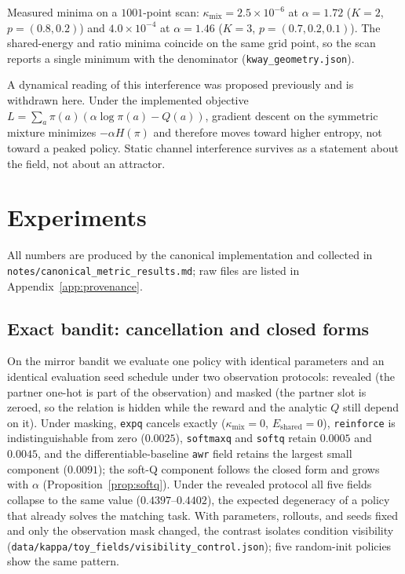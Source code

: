\documentclass{article}
\newcommand{\kmix}{\kappa_{\mathrm{mix}}}
\begin{document}
\noindent Measured minima on a $1001$-point scan: $\kmix=2.5\times10^{-6}$ at
$\alpha=1.72$ ($K=2$, $p=(0.8,0.2)$) and $4.0\times10^{-4}$ at $\alpha=1.46$
($K=3$, $p=(0.7,0.2,0.1)$). The shared-energy and ratio minima coincide on the
same grid point, so the scan reports a single minimum with the denominator
(\texttt{kway\_geometry.json}).

A dynamical reading of this interference was proposed previously and is
withdrawn here. Under the implemented objective
$L=\sum_a\pi(a)(\alpha\log\pi(a)-Q(a))$, gradient descent on the symmetric
mixture minimizes $-\alpha H(\pi)$ and therefore moves toward higher entropy,
not toward a peaked policy. Static channel interference survives as a
statement about the field, not about an attractor.

\section{Experiments}
\label{sec:experiments}

All numbers are produced by the canonical implementation and collected in
\texttt{notes/canonical\_metric\_results.md}; raw files are listed in
Appendix~\ref{app:provenance}.

\subsection{Exact bandit: cancellation and closed forms}
\label{sec:exp-toy}

On the mirror bandit we evaluate one policy with identical parameters and an
identical evaluation seed schedule under two observation protocols: revealed
(the partner one-hot is part of the observation) and masked (the partner slot
is zeroed, so the relation is hidden while the reward and the analytic $Q$
still depend on it). Under masking, \texttt{expq} cancels exactly
($\kmix=0$, $E_{\mathrm{shared}}=0$), \texttt{reinforce} is indistinguishable
from zero ($0.0025$), \texttt{softmaxq} and \texttt{softq} retain $0.0005$
and $0.0045$, and the differentiable-baseline \texttt{awr} field retains the
largest small component ($0.0091$); the soft-Q component follows the closed
form and grows with $\alpha$ (Proposition~\ref{prop:softq}). Under the
revealed protocol all five fields collapse to the same value
($0.4397$--$0.4402$), the expected degeneracy of a policy that already solves
the matching task. With parameters, rollouts, and seeds fixed and only the
observation mask changed, the contrast isolates condition visibility
(\texttt{data/kappa/toy\_fields/visibility\_control.json}); five random-init
policies show the same pattern.
\end{document}
